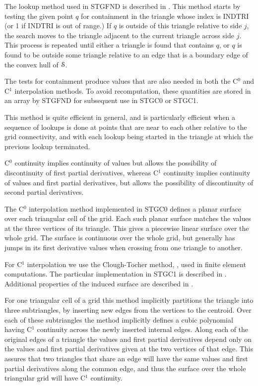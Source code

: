 \documentclass[twoside]{MATH77}
\begin{document}
The lookup method used in STGFND is described in \cite{Lawson:SC1:1977}.
This method starts by testing the given point $q$ for containment in the
triangle whose index is INDTRI (or 1 if INDTRI is out of range.) If $q$ is
outside of this triangle relative to side $j$, the search moves to the
triangle adjacent to the current triangle across side $j$.  This process
is repeated until either a triangle is found that contains $q$, or $q$ is
found to be outside some triangle relative to an edge that is a boundary
edge of the convex hull of {$\EuScript S$}.

The tests for containment produce values that are also needed in
both the C$^0$ and C$^1$ interpolation methods.  To avoid recomputation,
these quantities are stored in an array by STGFND for subsequent
use in STGC0 or STGC1.

This method is quite efficient in general, and is particularly efficient
when a sequence of lookups is done at points that are near to each
other relative to the grid connectivity, and with each lookup being started
in the triangle at which the previous lookup terminated.

C$^0$ continuity implies continuity of values but allows the possibility
of discontinuity of first partial derivatives, whereas
C$^1$ continuity implies continuity of values and first partial
derivatives,  but allows the possibility
of discontinuity of second partial derivatives.

The C$^0$ interpolation method implemented in STGC0
defines a planar surface over each triangular
cell of the grid.  Each such planar surface matches the values at
the three vertices of its triangle.  This gives a piecewise linear
surface over the whole grid.  The surface is continuous over the
whole grid, but generally has jumps in its first derivative values
when crossing from one triangle to another.

For C$^1$ interpolation we use the Clough-Tocher method,
\cite{Clough:1965:FES}, used in finite element computations.  The
particular implementation in STGC1 is described in \cite{Lawson:1976:C1C}.
Additional properties of the induced surface are described in
\cite{Lawson:1976:IC1}.

For one triangular cell of a grid this method implicitly partitions
the triangle into three subtriangles, by inserting new edges from
the vertices to the centroid.  Over each of these subtriangles the
method implicitly defines a cubic polynomial having C$^1$ continuity
across the newly inserted internal edges.  Along each of the original
edges of a triangle the values and first partial derivatives depend
only on the values and first partial derivatives
given at the two vertices of that edge.
This assures that two triangles that share an edge will have the
same values and first partial derivatives along the common edge, and
thus the surface over the whole triangular grid will have C$^1$
continuity.
\end{document}
